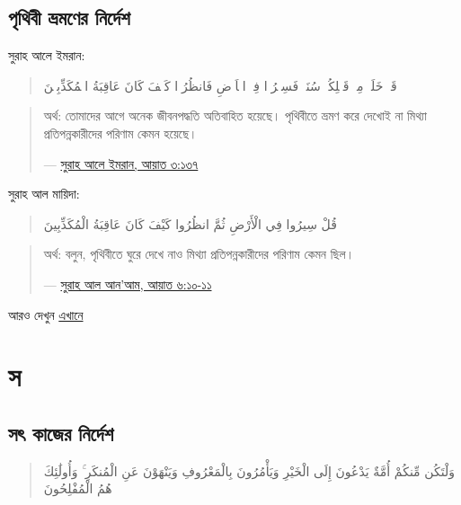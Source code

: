 \documentclass[
]{book}
\begin{document}
\hypertarget{traveling}{%
\subsection*{পৃথিবী ভ্রমণের নির্দেশ}\label{traveling}}

সুরাহ আলে ইমরান:

\begin{quote}
قَدۡ خَلَتۡ مِنۡ قَبۡلِكُمۡ سُنَنٌۙ فَسِيۡرُوۡا فِىۡ الۡاَرۡضِ فَانظُرُوۡا كَيۡفَ كَانَ عَاقِبَةُ الۡمُكَذِّبِيۡنَ
\end{quote}

\begin{quote}
অর্থ: তোমাদের আগে অনেক জীবনপদ্ধতি অতিবাহিত হয়েছে। পৃথিবীতে ভ্রমণ করে দেখোই না মিথ্যা প্রতিপন্নকারীদের পরিণাম কেমন হয়েছে।

--- \href{https://tanzil.net/\#3:137}{সুরাহ আলে ইমরান, আয়াত ৩:১৩৭}
\end{quote}

সুরাহ আল মায়িদা:

\begin{quote}
قُلْ سِيرُوا فِي الْأَرْضِ ثُمَّ انظُرُوا كَيْفَ كَانَ عَاقِبَةُ الْمُكَذِّبِينَ
\end{quote}

\begin{quote}
অর্থ: বলুন, পৃথিবীতে ঘুরে দেখে নাও মিথ্যা প্রতিপন্নকারীদের পরিণাম কেমন ছিল।

--- \href{https://tanzil.net/\#6:11}{সুরাহ আল আন'আম, আয়াত ৬:১০-১১}
\end{quote}

আরও দেখুন \href{../islam/travelling.al}{এখানে}

\hypertarget{s}{%
\section*{স}\label{s}}

\hypertarget{enjoining-on-good-deeds}{%
\subsection*{সৎ কাজের নির্দেশ}\label{enjoining-on-good-deeds}}

\begin{quote}
وَلْتَكُن مِّنكُمْ أُمَّةٌ يَدْعُونَ إِلَى الْخَيْرِ وَيَأْمُرُونَ بِالْمَعْرُوفِ وَيَنْهَوْنَ عَنِ الْمُنكَرِ ۚ وَأُولَٰئِكَ هُمُ الْمُفْلِحُونَ
\end{quote}
\end{document}
